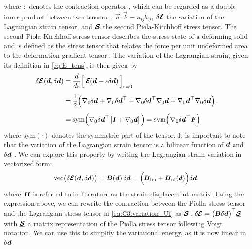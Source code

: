 %	
where $:$ denotes the contraction operator \cite{Kim2018, Holzapfel2002}, which can be regarded as a double inner product between two tensors, \ie, $\vec{a} : \vec{b} = a_{ij} b_{ij}$, $\delta \boldsymbol{\mathcal{E}}$ the variation of the Lagrangian strain tensor, and $\boldsymbol{\mathcal{S}}$ the second Piola-Kirchhoff stress tensor. The second Piola-Kirchhoff stress tensor describes the stress state of a deforming solid and is defined as the stress tensor that relates the force per unit undeformed area to the deformation gradient tensor \cite{Holzapfel2002}. %
The variation of the Lagrangian strain, given its definition in \eqref{eq:E_tens}, is then given by
%
\begin{align}
\delta \boldsymbol{\mathcal{E}}({\boldsymbol{d}}, \delta {\boldsymbol{d}}) & = \frac{d}{d\varepsilon} \Big[ \,\boldsymbol{\mathcal{E}} ({\boldsymbol{d}} + \varepsilon \delta {\boldsymbol{d}}) \, \Big]_{\varepsilon = 0} \notag  \\[0.5em]
& = \frac{1}{2} \Big(\nabla_0 \delta {\boldsymbol{d}} + \nabla_0 \delta {\boldsymbol{d}}^\top + \nabla_0 \delta {\boldsymbol{d}}^\top \nabla_0 {\boldsymbol{d}} + \nabla_0{\boldsymbol{d}}^\top \nabla_0  \delta {\boldsymbol{d}}  \Big), \notag \\[0.5em]
& = \textrm{sym}\Big(\nabla_0 \delta {\boldsymbol{d}}^\top \left[{\boldsymbol{I}} +  \nabla_0 {\boldsymbol{d}} \right] \Big) = \textrm{sym} \Big( \nabla_0 \delta {\boldsymbol{d}}^\top {\boldsymbol{F}} \Big)
\label{eq:C3:variation_Uf}
\end{align}
%
where $\textrm{sym}(\cdot)$ denotes the symmetric part of the tensor. It is important to note that the variation of the Lagrangian strain tensor is a bilinear function of ${\boldsymbol{d}}$ and $\delta {\boldsymbol{d}}$ \cite{Kim2018}. We can explore this property by writing the Lagrangian strain variation in vectorized form:
%
\begin{equation}
\textrm{vec}\big(\delta \boldsymbol{\mathcal{E}}({\boldsymbol{d}},\delta {\boldsymbol{d}})\big) = {\boldsymbol{B}}({\boldsymbol{d}}) \, \delta {\boldsymbol{d}} = \Big({\boldsymbol{B}}_{\textrm{lin}} + {\boldsymbol{B}}_{\textrm{nl}}({\boldsymbol{d}}) \Big) \delta {\boldsymbol{d}},
\end{equation}
% 
where ${\boldsymbol{B}}$ is referred to in literature as the strain-displacement matrix. Using the expression above, we can rewrite the contraction between the Piolla stress tensor and the Lagrangian stress tensor in \eqref{eq:C3:variation_Uf} as $\boldsymbol{\mathcal{S}} : \delta \boldsymbol{\mathcal{E}} = \big({\boldsymbol{B}} \delta {\boldsymbol{d}}\big)^\top \underline{\boldsymbol{\mathcal{S}}}$ with $\underline{\boldsymbol{\mathcal{S}}}$ a matrix representation of the Piolla stress tensor following Voigt notation. We can use this to simplify the variational energy, as it is now linear in $\delta {\boldsymbol{d}}$. 

